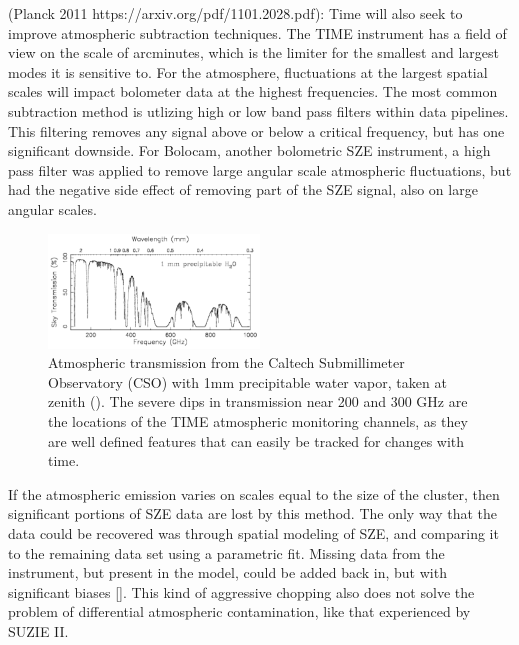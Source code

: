 \documentclass[manuscript]{aastex}
\begin{document}
(Planck 2011 https://arxiv.org/pdf/1101.2028.pdf):
Time will also seek to improve atmospheric subtraction techniques. The TIME instrument has a field of view on the scale of arcminutes, which is the limiter for the smallest and largest modes it is sensitive to. For the atmosphere, fluctuations at the largest spatial scales will impact bolometer data at the highest frequencies. The most common subtraction method is utlizing high or low band pass filters within data pipelines. This filtering removes any signal above or below a critical frequency, but has one significant downside. For Bolocam, another bolometric SZE instrument, a high pass filter was applied to remove large angular scale atmospheric fluctuations, but had the negative side effect of removing part of the SZE signal, also on large angular scales.  
\begin{figure}
\vspace{-0.8cm}
  \begin{center}
    \includegraphics[width=0.5\textwidth]{atmos.PNG}
   \end{center}
\caption[Atmospheric Transmission from the CSO -(\cite{Weisstein1996})]{Atmospheric transmission from the Caltech Submillimeter Observatory (CSO) with 1mm precipitable water vapor, taken at zenith (\cite{Weisstein1996}). The severe dips in transmission near 200 and 300 GHz are the locations of the TIME atmospheric monitoring channels, as they are well defined features that can easily be tracked for changes with time.}
\label{fig:atmos}
\end{figure}
If the atmospheric emission varies on scales equal to the size of the cluster, then significant portions of SZE data are lost by this method. The only way that the data could be recovered was through spatial modeling of SZE, and comparing it to the remaining data set using a parametric fit. Missing data from the instrument, but present in the model, could be added back in, but with significant biases [\cite{Sayers2013b}]. This kind of aggressive chopping also does not solve the problem of differential atmospheric contamination, like that experienced by SUZIE II.
\end{document}
